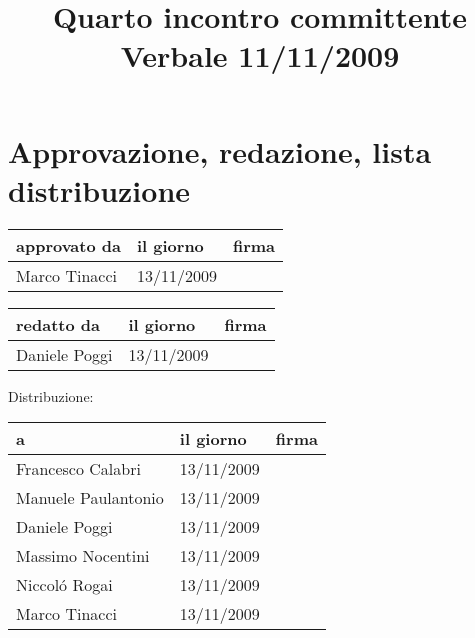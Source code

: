 \documentclass[a4paper, 12pt]{report}
\title{Quarto incontro committente \\Verbale 11/11/2009}
\date{11/11/2009 \\Firenze \\\begin{figure}[h] \centering \texttt{[image: ../../../../images/logokiwi.png]} \end{figure} }
\begin{document}
\maketitle

\newpage

\section*{Approvazione, redazione, lista distribuzione}
\begin{table}[h!]
  \begin{center}
    \begin{tabular}{| l | l | p{60mm} |}
    \hline
    \textbf{approvato da} & \textbf{il giorno} & \textbf{firma} \\
	\hline    
	Marco Tinacci & 13/11/2009 &  \\
    \hline
    \end{tabular}
  \end{center}
\end{table}

\begin{table}[h!]
  \begin{center}
    \begin{tabular}{| l | l | p{60mm} |}
    \hline
    \textbf{redatto da} & \textbf{il giorno} & \textbf{firma} \\
	\hline    
	Daniele Poggi & 13/11/2009 &  \\
    \hline
    \end{tabular}
  \end{center}
\end{table}

Distribuzione:
\begin{table}[h!]
  \begin{center}
    \begin{tabular}{| l | l | p{60mm} |}
    \hline
    \textbf{a} & \textbf{il giorno} & \textbf{firma} \\
	\hline    
	Francesco Calabri & 13/11/2009 &  \\
    \hline
	Manuele Paulantonio & 13/11/2009 &  \\
    \hline
	Daniele Poggi & 13/11/2009 &  \\
    \hline
	Massimo Nocentini & 13/11/2009 &  \\
    \hline
	Niccol\'o Rogai & 13/11/2009 &  \\
    \hline
	Marco Tinacci & 13/11/2009 &  \\
    \hline
    \end{tabular}
  \end{center}
\end{table}

\newpage


\end{document}
